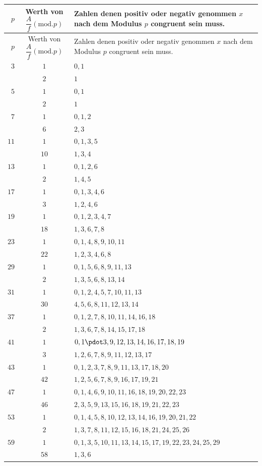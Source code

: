 \clearpage{}
\begingroup\fontsize{9.5}{12}\selectfont\setlength{\tabcolsep}{4pt}\renewcommand{\arraystretch}{1.10}
\begin{longtable}{r|c|p{262pt}}
\hline
$p$ & \shortstack{Werth von\\$\dfrac{A}{f}(\mathrm{mod}.p)$} & Zahlen denen positiv oder negativ genommen $x$ nach dem Modulus $p$ congruent sein muss.\\\hline
\endfirsthead
$p$ & \shortstack{Werth von\\$\dfrac{A}{f}(\mathrm{mod}.p)$} & Zahlen denen positiv oder negativ genommen $x$ nach dem Modulus $p$ congruent sein muss.\\\hline
\endhead
$3$ & $1$ & $0,1$\\
 & $2$ & $1$\\
$5$ & $1$ & $0,1$\\
 & $2$ & $1$\\
$7$ & $1$ & $0,1,2$\\
 & $6$ & $2,3$\\
$11$ & $1$ & $0,1,3,5$\\
 & $10$ & $1,3,4$\\
$13$ & $1$ & $0,1,2,6$\\
 & $2$ & $1,4,5$\\
$17$ & $1$ & $0,1,3,4,6$\\
 & $3$ & $1,2,4,6$\\
$19$ & $1$ & $0,1,2,3,4,7$\\
 & $18$ & $1,3,6,7,8$\\
$23$ & $1$ & $0,1,4,8,9,10,11$\\
 & $22$ & $1,2,3,4,6,8$\\
$29$ & $1$ & $0,1,5,6,8,9,11,13$\\
 & $2$ & $1,3,5,6,8,13,14$\\
$31$ & $1$ & $0,1,2,4,5,7,10,11,13$\\
 & $30$ & $4,5,6,8,11,12,13,14$\\
$37$ & $1$ & $0,1,2,7,8,10,11,14,16,18$\\
 & $2$ & $1,3,6,7,8,14,15,17,18$\\
$41$ & $1$ & $0,1\pdot 3,9,12,13,14,16,17,18,19$\\
 & $3$ & $1,2,6,7,8,9,11,12,13,17$\\
$43$ & $1$ & $0,1,2,3,7,8,9,11,13,17,18,20$\\
 & $42$ & $1,2,5,6,7,8,9,16,17,19,21$\\
$47$ & $1$ & $0,1,4,6,9,10,11,16,18,19,20,22,23$\\
 & $46$ & $2,3,5,9,13,15,16,18,19,21,22,23$\\
$53$ & $1$ & $0,1,4,5,8,10,12,13,14,16,19,20,21,22$\\
 & $2$ & $1,3,7,8,11,12,15,16,18,21,24,25,26$\\
$59$ & $1$ & $0,1,3,5,10,11,13,14,15,17,19,22,23,24,25,29$\\
 & $58$ & $1,3,6$\\
\end{longtable}\endgroup
